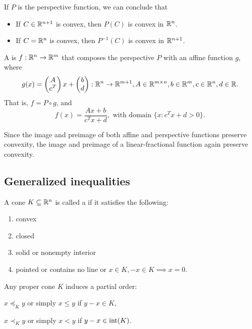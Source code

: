 \documentclass[class=article,crop=false]{standalone}
\begin{document}
If $ P$ is the perspective function, we can conclude that
~\begin{itemize}
	\item If $ C \in \mathbb{R}^{n+1}$ is convex, then $ P(C)$ is convex in $ \mathbb{R}^{n}$.
	\item If $ C = \mathbb{R}^{n}$ is convex, then $ P^{-1}(C)$ is convex in $ \mathbb{R}^{n+1}$.
\end{itemize}

\begin{defn}
A  is $ f: \mathbb{R}^{n} \to \mathbb{R}^{m}$ that composes the perspective $ P$ with an affine function $ g$, where
 \[
	 g(x) = \begin{pmatrix} A\\c^{T}\\ \end{pmatrix} x + \begin{pmatrix} b\\d \end{pmatrix} : \mathbb{R}^{n} \to \mathbb{R}^{m+1}, A \in \mathbb{R}^{m \times n}, b \in \mathbb{R}^{m}, c \in \mathbb{R}^{n}, d \in \mathbb{R}
.\] 
That is, $ f=P \circ g$, and
 \[
	 f(x) = \frac{Ax+b}{c^{T}x + d }, \text{ with domain }  \{x: c ^{T} x + d >0\}  
.\] 
\end{defn}

\begin{note}
Since the image and preimage of both affine and perspective functions preserve convexity, the image and preimage of a linear-fractional function again preserve convexity.
\end{note}

\subsection{Generalized inequalities}

\begin{defn}
A cone $ K \subseteq \mathbb{R}^{n}$ is called a  if it satisfies the following: 
\begin{enumerate}[label=\arabic*)]
	\item convex
	\item closed
	\item solid or nonempty interior
	\item pointed or contains no line or $ x \in K, -x \in K \implies x=0$.
\end{enumerate}
\end{defn}

\begin{prop}
Any proper cone $ K$ induces a partial order:

$x \preceq_{K} y$ or simply $ x\leq y$ if  $ y-x \in K$,

$ x \prec_{K} y$ or simply $ x<y$ if  $ y-x \in \operatorname{int}(K)$.
\end{prop}
\end{document}

